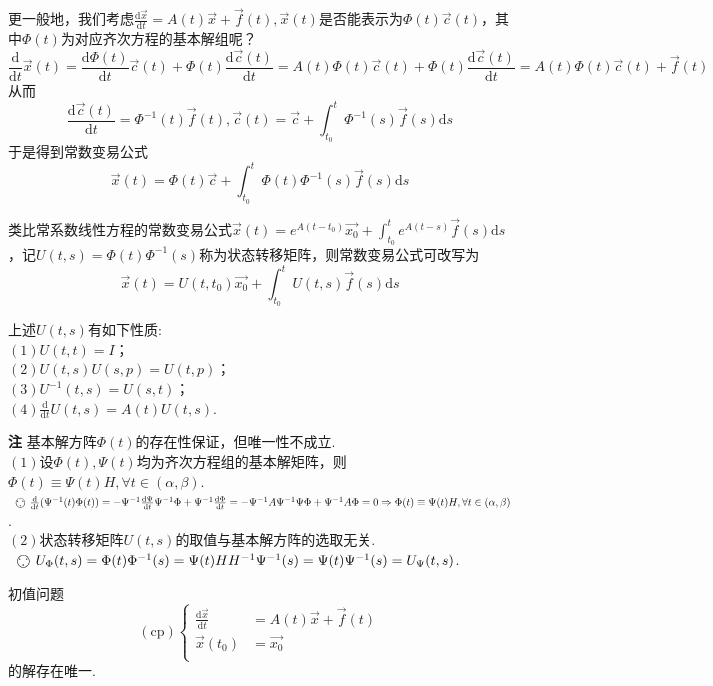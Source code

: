 \documentclass{ctexart}
\newcommand{\bec}{\kern 0.56em\bigcirc \kern -0.85em {\small \because}\kern 0.56em}
\newenvironment{custom}[1]{\par\noindent \textbf{#1}\quad}{\par\vspace{1em}}
\begin{document}
更一般地，我们考虑$\frac{\mathrm{d}\vec{x}}{\mathrm{d}t}=A(t)\vec{x}+\vec{f}(t),\vec{x}(t)$是否能表示为$\Phi(t)\vec{c}(t)$，其中$\Phi(t)$为对应齐次方程的基本解组呢？
$$\frac{\mathrm{d}}{\mathrm{d}t}\vec{x}(t)=\frac{\mathrm{d}\Phi(t)}{\mathrm{d}t}\vec{c}(t)+\Phi(t)\frac{\mathrm{d}\vec{c}(t)}{\mathrm{d}t}=A(t)\Phi(t)\vec{c}(t)+\Phi(t)\frac{\mathrm{d}\vec{c}(t)}{\mathrm{d}t}=A(t)\Phi(t)\vec{c}(t)+\vec{f}(t)$$
从而
$$\frac{\mathrm{d}\vec{c}(t)}{\mathrm{d}t}=\Phi^{-1}(t)\vec{f}(t),\vec{c}(t)=\vec{c}+\int_{t_{0}}^{t}{\Phi^{-1}(s)\vec{f}(s)\mathrm{d}s}$$
于是得到常数变易公式
$$\vec{x}(t)=\Phi(t)\vec{c}+\int_{t_{0}}^{t}{\Phi(t)\Phi^{-1}(s)\vec{f}(s)\mathrm{d}s}$$

类比常系数线性方程的常数变易公式$\vec{x}(t)=e^{A(t-t_{0})}\vec{x_{0}}+\int_{t_{0}}^{t}{e^{A(t-s)}\vec{f}(s)\mathrm{d}s}$，记$U(t,s)=\Phi(t)\Phi^{-1}(s)$称为状态转移矩阵，则常数变易公式可改写为
$$\vec{x}(t)=U(t,t_{0})\vec{x_{0}}+\int_{t_{0}}^{t}{U(t,s)\vec{f}(s)\mathrm{d}s}$$
\begin{theorem}[$U(t,s)$的性质]
上述$U(t,s)$有如下性质:\\
$(1)U(t,t)=I$；\\
$(2)U(t,s)U(s,p)=U(t,p)$；\\
$(3)U^{-1}(t,s)=U(s,t)$；\\
$(4)\frac{\mathrm{d}}{\mathrm{d}t}U(t,s)=A(t)U(t,s)$.
\end{theorem}

\begin{custom}{注}
基本解方阵$\Phi(t)$的存在性保证，但唯一性不成立.\\
$(1)$设$\Phi(t),\Psi(t)$均为齐次方程组的基本解矩阵，则$\Phi(t)\equiv \Psi(t)H,\forall t\in(\alpha,\beta)$.\\
$\bec\frac{\mathrm{d}}{\mathrm{d}t}(\Psi^{-1}(t)\Phi(t))=-\Psi^{-1}\frac{\mathrm{d}\Psi}{\mathrm{d}t}\Psi^{-1}\Phi+\Psi^{-1}\frac{\mathrm{d}\Phi}{\mathrm{d}t}=-\Psi^{-1}A\Psi^{-1}\Psi\Phi+\Psi^{-1}A\Phi=0\Rightarrow \Phi(t)\equiv \Psi(t)H,\forall t\in(\alpha,\beta)$.\\
$(2)$状态转移矩阵$U(t,s)$的取值与基本解方阵的选取无关.\\
$\bec U_{\Phi}(t,s)=\Phi(t)\Phi^{-1}(s)=\Psi(t)HH^{-1}\Psi^{-1}(s)=\Psi(t)\Psi^{-1}(s)=U_{\Psi}(t,s)$.
\end{custom}

\begin{theorem}[线性常微分方程组初值问题解的存在唯一性定理]
初值问题
$$(\mathrm{cp})\left\{\begin{aligned}\frac{\mathrm{d}\vec{x}}{\mathrm{d}t}&=A(t)\vec{x}+\vec{f}(t)\\ \vec{x}(t_{0})&=\vec{x_{0}}\\\end{aligned}\right.$$
的解存在唯一.
\end{theorem}
\end{document}
